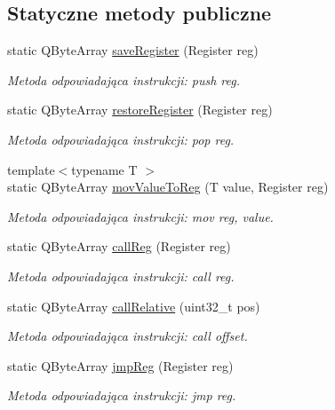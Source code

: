\subsection*{Statyczne metody publiczne}
\begin{DoxyCompactItemize}
\item 
static Q\-Byte\-Array \hyperlink{class_code_defines_a43a24be00649da7ebcaf172f515f43c7}{save\-Register} (Register reg)
\begin{DoxyCompactList}\small\item\em Metoda odpowiadająca instrukcji\-: push reg. \end{DoxyCompactList}\item 
static Q\-Byte\-Array \hyperlink{class_code_defines_a951d31c997529cea2553e7544598c505}{restore\-Register} (Register reg)
\begin{DoxyCompactList}\small\item\em Metoda odpowiadająca instrukcji\-: pop reg. \end{DoxyCompactList}\item 
{\footnotesize template$<$typename T $>$ }\\static Q\-Byte\-Array \hyperlink{class_code_defines_a968764a7855df79bf38a5049cf6bead4}{mov\-Value\-To\-Reg} (T value, Register reg)
\begin{DoxyCompactList}\small\item\em Metoda odpowiadająca instrukcji\-: mov reg, value. \end{DoxyCompactList}\item 
static Q\-Byte\-Array \hyperlink{class_code_defines_af702a87ffaa59e27f44ec8d9f1ff5ad0}{call\-Reg} (Register reg)
\begin{DoxyCompactList}\small\item\em Metoda odpowiadająca instrukcji\-: call reg. \end{DoxyCompactList}\item 
static Q\-Byte\-Array \hyperlink{class_code_defines_a51b4f9d160d76f39056cf5b7136b0a5a}{call\-Relative} (uint32\-\_\-t pos)
\begin{DoxyCompactList}\small\item\em Metoda odpowiadająca instrukcji\-: call offset. \end{DoxyCompactList}\item 
static Q\-Byte\-Array \hyperlink{class_code_defines_a5553e8054d6bb237d69a2393c6892484}{jmp\-Reg} (Register reg)
\begin{DoxyCompactList}\small\item\em Metoda odpowiadająca instrukcji\-: jmp reg. \end{DoxyCompactList}\item 

\end{DoxyCompactItemize}
